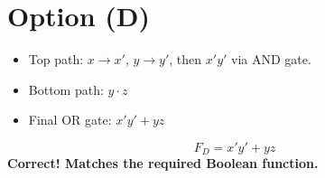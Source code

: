 \documentclass{article}
\begin{document}
\section*{Option (D)}

\begin{itemize}
    \item Top path: $x \rightarrow x'$, $y \rightarrow y'$, then $x'y'$ via AND gate.
    \item Bottom path: $y \cdot z$
    \item Final OR gate: $x'y' + yz$
\end{itemize}
\[
F_D = x'y' + yz
\]
\textbf{Correct! Matches the required Boolean function.}
\end{document}
